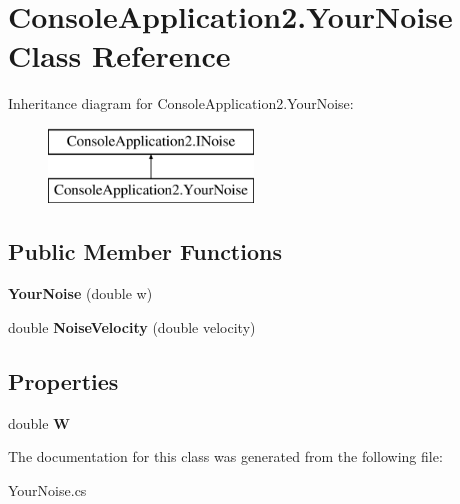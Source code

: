 \hypertarget{class_console_application2_1_1_your_noise}{}\section{Console\+Application2.\+Your\+Noise Class Reference}
\label{class_console_application2_1_1_your_noise}
Inheritance diagram for Console\+Application2.\+Your\+Noise\+:\begin{figure}[H]
\begin{center}
\leavevmode
\includegraphics[height=2.000000cm]{class_console_application2_1_1_your_noise}
\end{center}
\end{figure}
\subsection*{Public Member Functions}
\begin{DoxyCompactItemize}
\item 
\hypertarget{class_console_application2_1_1_your_noise_ab1e4461e963ea2eec83176533285d6bf}{}{\bfseries Your\+Noise} (double w)\label{class_console_application2_1_1_your_noise_ab1e4461e963ea2eec83176533285d6bf}

\item 
\hypertarget{class_console_application2_1_1_your_noise_a64822728bc3ba430397487dfeca189c7}{}double {\bfseries Noise\+Velocity} (double velocity)\label{class_console_application2_1_1_your_noise_a64822728bc3ba430397487dfeca189c7}

\end{DoxyCompactItemize}
\subsection*{Properties}
\begin{DoxyCompactItemize}
\item 
\hypertarget{class_console_application2_1_1_your_noise_a8f65e201a9ed900a30c3bdafbc6e9eb9}{}double {\bfseries W}\label{class_console_application2_1_1_your_noise_a8f65e201a9ed900a30c3bdafbc6e9eb9}

\end{DoxyCompactItemize}


The documentation for this class was generated from the following file\+:\begin{DoxyCompactItemize}
\item 
Your\+Noise.\+cs\end{DoxyCompactItemize}
